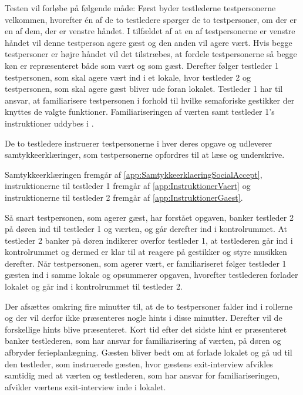 Testen vil forløbe på følgende måde: Først byder testlederne testpersonerne velkommen, hvorefter én af de to testledere spørger de to testpersoner, om der er en af dem, der er venstre håndet. I tilfældet af at en af testpersonerne er venstre håndet vil denne testperson agere gæst og den anden vil agere vært. Hvis begge testpersoner er højre håndet vil det tilstræbes, at fordele testpersonerne så begge køn er repræsenteret både som vært og som gæst. Derefter følger testleder 1 testpersonen, som skal agere vært ind i et lokale, hvor testleder 2 og testpersonen, som skal agere gæst bliver ude foran lokalet. Testleder 1 har til ansvar, at familiarisere testpersonen i forhold til hvilke semaforiske gestikker der knyttes de valgte funktioner. Familiariseringen af værten samt testleder 1's instruktioner uddybes i .  





De to testledere instruerer testpersonerne i hver deres opgave og udleverer samtykkeerklæringer, som testpersonerne opfordres til at læse og underskrive. 




Samtykkeerklæringen fremgår af \autoref{app:SamtykkeerklaeringSocialAccept}, instruktionerne til testleder 1 fremgår af \autoref{app:InstruktionerVaert} og instruktionerne til testleder 2 fremgår af \autoref{app:InstruktionerGaest}. 




Så snart testpersonen, som agerer gæst, har forstået opgaven, banker testleder 2 på døren ind til testleder 1 og værten, og går derefter ind i kontrolrummet. At testleder 2 banker på døren indikerer overfor testleder 1, at testlederen går ind i kontrolrummet og dermed er klar til at reagere på gestikker og styre musikken derefter. Når testpersonen, som agerer vært, er familiariseret følger testleder 1 gæsten ind i samme lokale og opsummerer opgaven, hvorefter testlederen forlader lokalet og går ind i kontrolrummet til testleder 2.
 
 
  

Der afsættes omkring fire minutter til, at de to testpersoner falder ind i rollerne og der vil derfor ikke præsenteres nogle hints i disse minutter. Derefter vil de forskellige hints blive præsenteret. Kort tid efter det sidste hint er præsenteret banker testlederen, som har ansvar for familiarisering af værten, på døren og afbryder ferieplanlægning. Gæsten bliver bedt om at forlade lokalet og gå ud til den testleder, som instruerede gæsten, hvor gæstens exit-interview afvikles samtidig med at værten og testlederen, som har ansvar for familiariseringen, afvikler værtens exit-interview inde i lokalet. 


